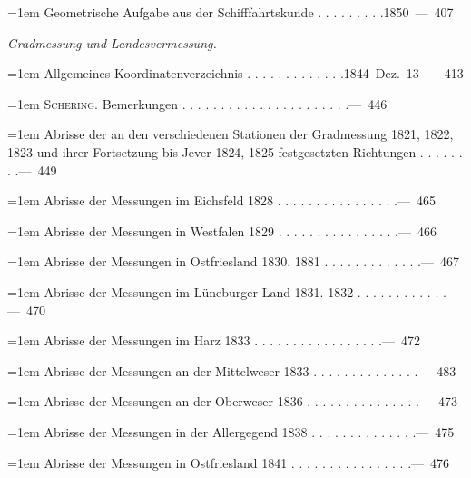 \par\noindent\hangindent=1em Geometrische Aufgabe aus der Schifffahrtskunde . . . . . . . . .\hfill{}\hbox{}\nobreak\hfill\mbox{1850 — 407}\par
\par\medskip{}
\noindent\textit{Gradmessung und Landesvermessung.}\par
\par\noindent\hangindent=1em Allgemeines Koordinatenverzeichnis . . . . . . . . . . . . .\hfill{}\hbox{}\nobreak\hfill\mbox{1844 Dez. 13 — 413}\par
\par\noindent\hangindent=1em \textsc{Schering}. Bemerkungen . . . . . . . . . . . . . . . . . . . . . .\hfill{}\hbox{}\nobreak\hfill\mbox{— 446}\par
\par\noindent\hangindent=1em Abrisse der an den verschiedenen Stationen der Gradmessung 1821, 1822, 1823 und ihrer Fortsetzung bis Jever 1824, 1825 festgesetzten Richtungen . . . . . . . .\hfill{}\hbox{}\nobreak\hfill\mbox{— 449}\par
\par\noindent\hangindent=1em Abrisse der Messungen im Eichsfeld 1828 . . . . . . . . . . . . . . . .\hfill{}\hbox{}\nobreak\hfill\mbox{— 465}\par
\par\noindent\hangindent=1em Abrisse der Messungen in Westfalen 1829 . . . . . . . . . . . . . . . .\hfill{}\hbox{}\nobreak\hfill\mbox{— 466}\par
\par\noindent\hangindent=1em Abrisse der Messungen in Ostfriesland 1830. 1881 . . . . . . . . . . . . .\hfill{}\hbox{}\nobreak\hfill\mbox{— 467}\par
\par\noindent\hangindent=1em Abrisse der Messungen im Lüneburger Land 1831. 1832 . . . . . . . . . . . .\hfill{}\hbox{}\nobreak\hfill\mbox{— 470}\par
\par\noindent\hangindent=1em Abrisse der Messungen im Harz 1833 . . . . . . . . . . . . . . . . .\hfill{}\hbox{}\nobreak\hfill\mbox{— 472}\par
\par\noindent\hangindent=1em Abrisse der Messungen an der Mittelweser 1833 . . . . . . . . . . . . . .\hfill{}\hbox{}\nobreak\hfill\mbox{— 483}\par
\par\noindent\hangindent=1em Abrisse der Messungen an der Oberweser 1836 . . . . . . . . . . . . . . .\hfill{}\hbox{}\nobreak\hfill\mbox{— 473}\par
\par\noindent\hangindent=1em Abrisse der Messungen in der Allergegend 1838 . . . . . . . . . . . . . .\hfill{}\hbox{}\nobreak\hfill\mbox{— 475}\par
\par\noindent\hangindent=1em Abrisse der Messungen in Ostfriesland 1841 . . . . . . . . . . . . . . . .\hfill{}\hbox{}\nobreak\hfill\mbox{— 476}\par
\endgroup
